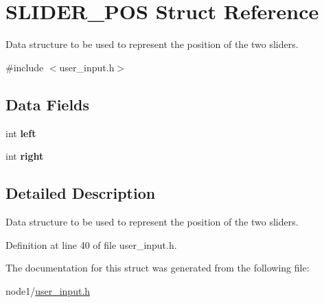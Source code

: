 \hypertarget{structSLIDER__POS}{}\section{S\+L\+I\+D\+E\+R\+\_\+\+P\+OS Struct Reference}
\label{structSLIDER__POS}


Data structure to be used to represent the position of the two sliders.  




{\ttfamily \#include $<$user\+\_\+input.\+h$>$}

\subsection*{Data Fields}
\begin{DoxyCompactItemize}
\item 
\mbox{\label{structSLIDER__POS_a46d181d71ca6dffaf28381563c837a90}} 
int {\bfseries left}
\item 
\mbox{\label{structSLIDER__POS_a1f57530f1fcce456048a7acdbdbf42ab}} 
int {\bfseries right}
\end{DoxyCompactItemize}


\subsection{Detailed Description}
Data structure to be used to represent the position of the two sliders. 

Definition at line 40 of file user\+\_\+input.\+h.



The documentation for this struct was generated from the following file\+:\begin{DoxyCompactItemize}
\item 
node1/\hyperlink{node1_2user__input_8h}{user\+\_\+input.\+h}\end{DoxyCompactItemize}
